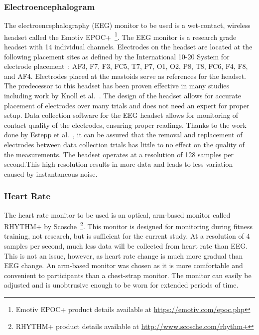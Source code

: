 \documentclass[11pt]{article}
\begin{document}
\subsubsection{Electroencephalogram}
The electroencephalography (EEG) monitor to be used is a wet-contact, wireless headset called the Emotiv EPOC+~\footnote{Emotiv EPOC+ product details available at \url{https://emotiv.com/epoc.php}}. The EEG monitor is a research grade headset with 14 individual channels. Electrodes on the headset are located at the following placement sites as defined by the International 10-20 System for electrode placement~\cite{Jasper}: AF3, F7, F3, FC5, T7, P7, O1, O2, P8, T8, FC6, F4, F8, and AF4. Electrodes placed at the mastoids serve as references for the headset. The predecessor to this headset has been proven effective in many studies including work by Knoll et al.~\cite{Knoll}. The design of the headset allows for accurate placement of electrodes over many trials and does not need an expert for proper setup. Data collection software for the EEG headset allows for monitoring of contact quality of the electrodes, ensuring proper readings. Thanks to the work done by Estepp et al.~\cite{Estepp_2015}, it can be assured that the removal and replacement of electrodes between data collection trials has little to no effect on the quality of the measurements. The headset operates at a resolution of 128 samples per second.This high resolution results in more data and leads to less variation caused by instantaneous noise.

\subsubsection{Heart Rate}
The heart rate monitor to be used is an optical, arm-based monitor called RHYTHM+ by Scosche~\footnote{RHYTHM+ product details available at \url{http://www.scosche.com/rhythm+}}. This monitor is designed for monitoring during fitness training, not research, but is sufficient for the current study. At a resolution of 4 samples per second, much less data will be collected from heart rate than EEG. This is not an issue, however, as heart rate change is much more gradual than EEG change. An arm-based monitor was chosen as it is more comfortable and convenient to participants than a chest-strap monitor. The monitor can easily be adjusted and is unobtrusive enough to be worn for extended periods of time.
\end{document}
